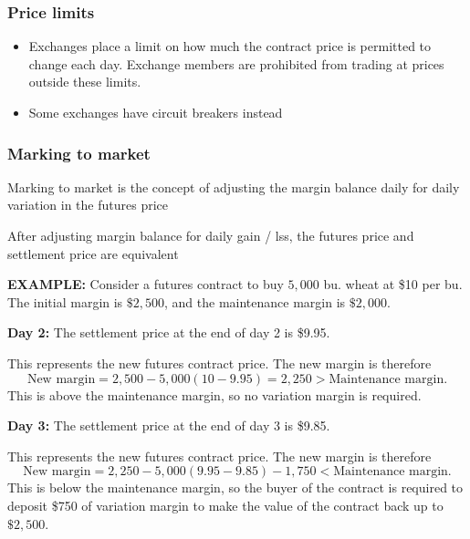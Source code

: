 \documentclass[../notes_compiled.tex]{subfiles}
\begin{document}
\subsubsection*{Price limits}
\begin{itemize}
\item Exchanges place a limit on how much the contract price is permitted to change each day. Exchange members are prohibited from trading at prices outside these limits.
\item Some exchanges have circuit breakers instead
\end{itemize}

\subsubsection*{Marking to market}
\begin{itemize}
\item Marking to market is the concept of adjusting the margin balance daily for daily variation in the futures price
\item After adjusting margin balance for daily gain / lss, the futures price and settlement price are equivalent
{\color{RedViolet}
\item[] \textbf{EXAMPLE:} Consider a futures contract to buy $5,000$ bu. wheat at \$10 per bu. The initial margin is $\$2,500$, and the maintenance margin is $\$2,000$.
\item[] \textbf{Day 2:} The settlement price at the end of day 2 is \$9.95.
}
{\color{RoyalBlue}
\item[] This represents the new futures contract price. The new margin is therefore
\begin{equation*}
\text{New margin} = 2,500 - 5,000(10-9.95) = 2,250>\text{Maintenance margin}.
\end{equation*}
This is above the maintenance margin, so no variation margin is required.
}
{\color{RedViolet}
\item[] \textbf{Day 3:} The settlement price at the end of day 3 is \$9.85.
}
{\color{RoyalBlue}
\item[] This represents the new futures contract price. The new margin is therefore
\begin{equation*}
\text{New margin} = 2,250 - 5,000(9.95-9.85) - 1,750<\text{Maintenance margin}.
\end{equation*}
This is below the maintenance margin, so the buyer of the contract is required to deposit \$750 of variation margin to make the value of the contract back up to $\$2,500$.
}
\end{itemize}
\end{document}
